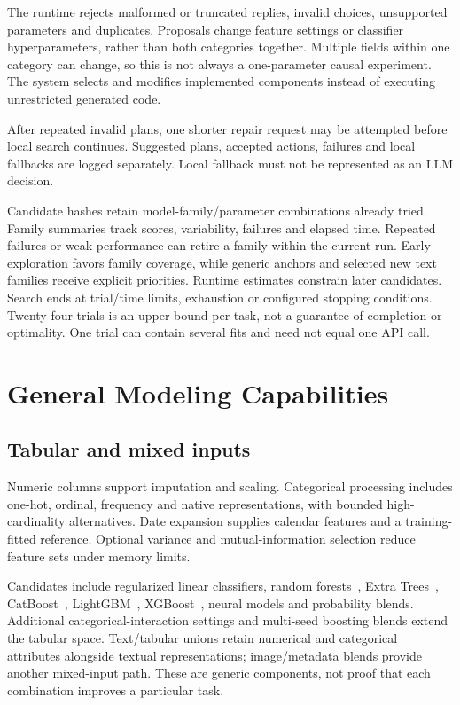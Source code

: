 \documentclass[11pt,a4paper]{article}
\begin{document}
The runtime rejects malformed or truncated replies, invalid choices, unsupported parameters and duplicates. Proposals change feature settings or classifier hyperparameters, rather than both categories together. Multiple fields within one category can change, so this is not always a one-parameter causal experiment. The system selects and modifies implemented components instead of executing unrestricted generated code.

After repeated invalid plans, one shorter repair request may be attempted before local search continues. Suggested plans, accepted actions, failures and local fallbacks are logged separately. Local fallback must not be represented as an LLM decision.

Candidate hashes retain model-family/parameter combinations already tried. Family summaries track scores, variability, failures and elapsed time. Repeated failures or weak performance can retire a family within the current run. Early exploration favors family coverage, while generic anchors and selected new text families receive explicit priorities. Runtime estimates constrain later candidates. Search ends at trial/time limits, exhaustion or configured stopping conditions. Twenty-four trials is an upper bound per task, not a guarantee of completion or optimality. One trial can contain several fits and need not equal one API call.

\section{General Modeling Capabilities}
\subsection{Tabular and mixed inputs}
Numeric columns support imputation and scaling. Categorical processing includes one-hot, ordinal, frequency and native representations, with bounded high-cardinality alternatives. Date expansion supplies calendar features and a training-fitted reference. Optional variance and mutual-information selection reduce feature sets under memory limits.

Candidates include regularized linear classifiers, random forests~\cite{rf}, Extra Trees~\cite{extratrees}, CatBoost~\cite{catboost}, LightGBM~\cite{lightgbm}, XGBoost~\cite{xgboost}, neural models and probability blends. Additional categorical-interaction settings and multi-seed boosting blends extend the tabular space. Text/tabular unions retain numerical and categorical attributes alongside textual representations; image/metadata blends provide another mixed-input path. These are generic components, not proof that each combination improves a particular task.
\end{document}
